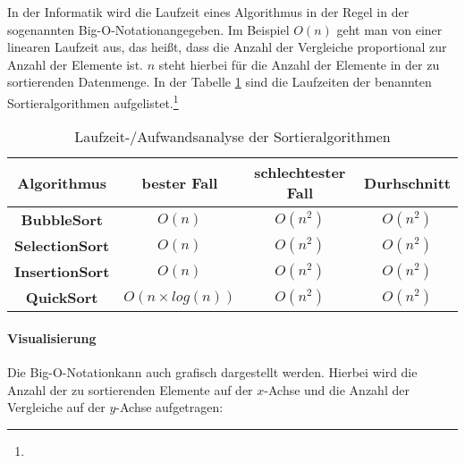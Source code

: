 \documentclass[./entry.tex]{subfiles}
\begin{document}
    In der Informatik wird die Laufzeit eines Algorithmus in der Regel in der sogenannten \dq Big-O-Notation\dq angegeben.
    Im Beispiel $O(n)$ geht man von einer linearen Laufzeit aus, das heißt, dass die Anzahl der
    Vergleiche proportional zur Anzahl der Elemente ist.
    $n$ steht hierbei für die Anzahl der Elemente in der zu sortierenden Datenmenge.
    In der Tabelle \ref{tab:runtimeanalysis} sind die Laufzeiten der benannten Sortieralgorithmen aufgelistet.\footnote{}


    \begin{table}[h]
        \centering
        \begin{tabular}{|c|c|c|c|}
            \hline
            \textbf{Algorithmus}                                                     & \textbf{bester Fall} & \textbf{schlechtester Fall} & \textbf{Durhschnitt} \\
            \hline
            \textbf{BubbleSort}\tablefootnote{\bscite{bubble-sort-aufwand}}          & $O(n)$               & $O(n^2)$                    & $O(n^2)$             \\
            \hline
            \textbf{SelectionSort}\tablefootnote{\bscite{selection-sort-complexity}} & $O(n)$               & $O(n^2)$ & $O(n^2)$ \\
            \hline
            \textbf{InsertionSort}\tablefootnote{\bscite{insertion-sort}}            & $O(n)$               & $O(n^2)$                    & $O(n^2)$             \\
            \hline
            \textbf{QuickSort}\tablefootnote{\bscite{quick-sort}}                    & $O(n \times log(n))$ & $O(n^2)$                    & $O(n^2)$             \\
            \hline
        \end{tabular}
        \caption{Laufzeit-/Aufwandsanalyse der Sortieralgorithmen}
        \label{tab:runtimeanalysis}
    \end{table}

    \paragraph{Visualisierung} Die \dq Big-O-Notation\dq kann auch grafisch dargestellt werden.
    Hierbei wird die Anzahl der zu sortierenden Elemente auf der $x$-Achse und die Anzahl der Vergleiche auf der $y$-Achse aufgetragen:
\end{document}
